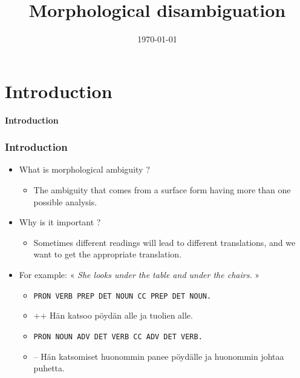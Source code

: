 \documentclass[10pt,xetex]{beamer} %
\date{\today}
\title{{Morphological disambiguation}}
\begin{document}
\section{Introduction}

\begin{frame} %
 \begin{center}
 {\Large {\bf Introduction}}  %
 \end{center}
\end{frame}

\begin{frame}
  \frametitle{Introduction}

\begin{itemize}
  \item What is morphological ambiguity ?
  \begin{itemize}
    \item The ambiguity that comes from a surface form having more than one possible analysis.
  \end{itemize}
  \item Why is it important ?
  \begin{itemize}
    \item Sometimes different readings will lead to different translations, and we want
       to get the appropriate translation.
  \end{itemize}
\pause
  \item For example: « \emph{She looks under the table and under the chairs.} »
    \begin{itemize}
       \item \texttt{PRON VERB PREP DET NOUN CC PREP DET NOUN.}
       \item ++ Hän katsoo pöydän alle ja tuolien alle.
    \end{itemize}
    \begin{itemize}
       \item \texttt{PRON NOUN ADV DET VERB CC ADV DET VERB.}
       \item -- Hän katsomiset huonommin panee pöydälle ja huonommin johtaa puhetta.
    \end{itemize}
\end{itemize}

\end{frame}
\end{document}

